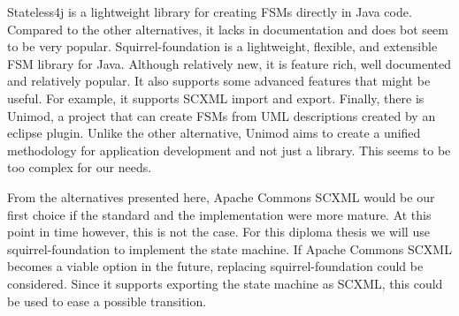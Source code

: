 Stateless4j is a lightweight library for creating FSMs directly in Java code.
Compared to the other alternatives, it lacks in documentation and does bot seem to be very popular.
Squirrel-foundation is a lightweight, flexible, and extensible FSM library for Java.
Although relatively new, it is feature rich, well documented and relatively popular.
It also supports some advanced features that might be useful.
For example, it supports SCXML import and export.
Finally, there is Unimod, a project that can create FSMs from UML descriptions created by an eclipse plugin.
Unlike the other alternative, Unimod aims to create a unified methodology for application development and not just a library.
This seems to be too complex for our needs.

From the alternatives presented here, Apache Commons SCXML would be our first choice if the standard and the implementation were more mature.
At this point in time however, this is not the case.
For this diploma thesis we will use squirrel-foundation to implement the state machine.
If Apache Commons SCXML becomes a viable option in the future, replacing squirrel-foundation could be considered.
Since it supports exporting the state machine as SCXML, this could be used to ease a possible transition.
